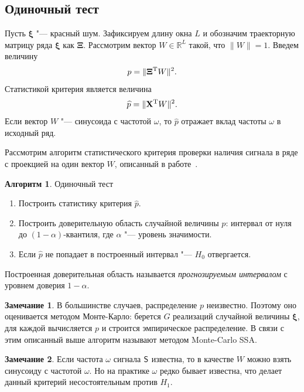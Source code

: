 \documentclass[specialist,
substylefile = spbu_report.rtx,
subf,href,colorlinks=true, 12pt]{disser}
\theoremstyle{definition}
\newtheorem{algorithm}{Алгоритм}
\newtheorem{remark}{Замечание}
\newcommand{\R}{\mathbb{R}}
\newcommand{\bfxi}{\boldsymbol{\xi}}
\begin{document}
\subsection{Одиночный тест}\label{sect:single_test}
Пусть $\bfxi$ "--- красный шум. Зафиксируем длину окна $L$ и обозначим траекторную матрицу ряда $\bfxi$ как $\mathbf\Xi$. Рассмотрим вектор $W\in \R^{L}$ такой, что $\|W\|=1$. Введем величину
\[
	p=\|\mathbf{\Xi}^{\mathrm{T}} W\|^2.
\]
Статистикой критерия является величина
\[
	\widehat{p}=\|\mathbf{X}^{\mathrm{T}} W\|^2.
\]
Если вектор $W$ "--- синусоида с частотой $\omega$, то $\widehat{p}$ отражает вклад частоты $\omega$ в исходный ряд.

Рассмотрим алгоритм статистического критерия проверки наличия сигнала в ряде с проекцией на один вектор $W$, описанный в работе~\cite{Golyandina_2023}.
\begin{algorithm}{Одиночный тест~\cite{Golyandina_2023}}
	\begin{enumerate}
		\item Построить статистику критерия $\widehat p$.
		\item Построить доверительную область случайной величины $p$: интервал от нуля до $(1-\alpha)$-квантиля, где $\alpha$ "--- уровень значимости.
		\item Если $\widehat p$	не попадает в построенный интервал "--- $H_0$ отвергается.
	\end{enumerate}
\end{algorithm}
Построенная доверительная область называется \textit{прогнозируемым интервалом} с уровнем доверия $1-\alpha$.
\begin{remark}
В большинстве случаев, распределение $p$ неизвестно. Поэтому оно оценивается методом Монте-Карло: берется $G$ реализаций случайной величины $\boldsymbol\xi$, для каждой вычисляется $p$ и строится эмпирическое распределение. В связи с этим описанный выше алгоритм называют методом Monte-Carlo SSA.
\end{remark}
\begin{remark}
Если частота $\omega$ сигнала $\mathsf{S}$ известна, то в качестве $W$ можно взять синусоиду с частотой $\omega$. Но на практике $\omega$ редко бывает известна, что делает данный критерий несостоятельным против $H_1$.
\end{remark}
\end{document}
